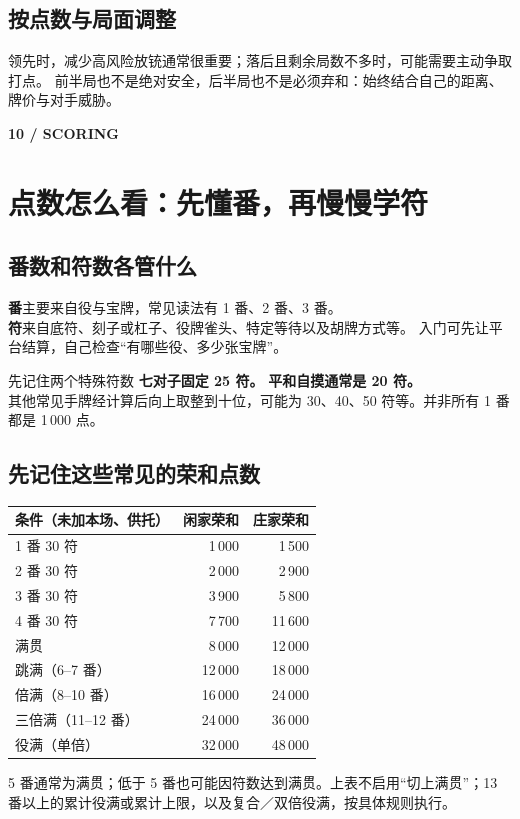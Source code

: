 \documentclass[UTF8,a4paper,zihao=5,fontset=fandol]{ctexart}
\newcommand{\pageintro}[3]{\clearpage\phantomsection\label{#1}
 {\small\sffamily\bfseries\color{gold}#2}\par\vspace{2pt}\section{#3}}
\newcommand{\smalltext}[1]{{\small\color{muted}#1}}
\begin{document}
\subsection{按点数与局面调整}
领先时，减少高风险放铳通常很重要；落后且剩余局数不多时，可能需要主动争取打点。
前半局也不是绝对安全，后半局也不是必须弃和：始终结合自己的距离、牌价与对手威胁。

\pageintro{score}{10 / SCORING}{点数怎么看：先懂番，再慢慢学符}
\subsection{番数和符数各管什么}
\textbf{番}主要来自役与宝牌，常见读法有 1 番、2 番、3 番。\\
\textbf{符}来自底符、刻子或杠子、役牌雀头、特定等待以及胡牌方式等。
入门可先让平台结算，自己检查“有哪些役、多少张宝牌”。

\begin{note}{先记住两个特殊符数}
\textbf{七对子固定 25 符。} \quad \textbf{平和自摸通常是 20 符。}\\
其他常见手牌经计算后向上取整到十位，可能为 30、40、50 符等。并非所有 1 番都是 1\,000 点。
\end{note}

\subsection{先记住这些常见的荣和点数}
\par\noindent\begin{tabularx}{\linewidth}{Y r r}
\toprule
条件（未加本场、供托） & 闲家荣和 & 庄家荣和\\
 番 30 符 & 1\,000 & 1\,500\\
2 番 30 符 & 2\,000 & 2\,900\\
3 番 30 符 & 3\,900 & 5\,800\\
4 番 30 符 & 7\,700 & 11\,600\\
满贯 & 8\,000 & 12\,000\\
跳满（6--7 番） & 12\,000 & 18\,000\\
倍满（8--10 番） & 16\,000 & 24\,000\\
三倍满（11--12 番） & 24\,000 & 36\,000\\
役满（单倍） & 32\,000 & 48\,000\\
\bottomrule
\end{tabularx}\par\vspace{3pt}
\smalltext{5 番通常为满贯；低于 5 番也可能因符数达到满贯。上表不启用“切上满贯”；13 番以上的累计役满或累计上限，以及复合／双倍役满，按具体规则执行。}
\end{document}
